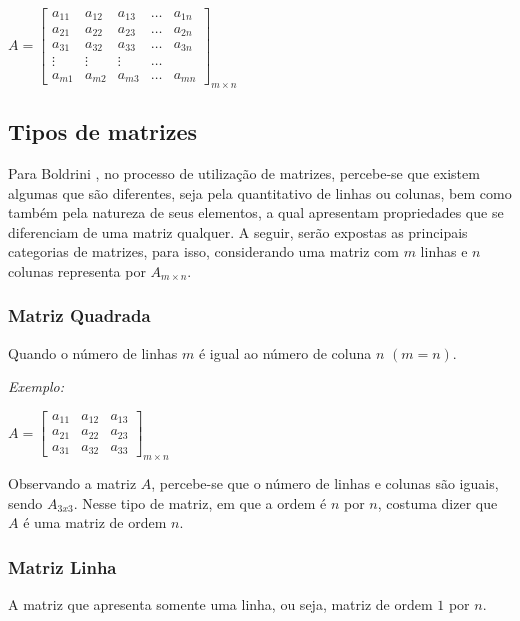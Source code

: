 \begin{center}
    $A = 
    \begin{bmatrix}
        a_{11} & a_{12} & a_{13} & \ldots & a_{1n}\\ 
        a_{21} & a_{22} & a_{23} & \ldots & a_{2n}\\ 
        a_{31} & a_{32} & a_{33} & \ldots & a_{3n}\\ 
        \vdots & \vdots & \vdots & \ldots & \\ 
        a_{m1} & a_{m2} & a_{m3} & \ldots & a_{mn}
    \end{bmatrix}_{m \times n}$
\end{center}

%
\subsection{Tipos de matrizes}
\noindent Para Boldrini \cite{1980:Boldrini}, no processo de utilização de matrizes, percebe-se que existem algumas que são diferentes, seja pela quantitativo de linhas ou colunas, bem como também pela natureza de seus elementos, a qual apresentam propriedades que se diferenciam de uma matriz qualquer. A seguir, serão expostas as principais categorias de matrizes, para isso, considerando uma matriz com $m$ linhas e $n$ colunas representa por $A{}_{m \times n}$.

\subsubsection{Matriz Quadrada}
\noindent Quando o número de linhas $m$ é igual ao número de coluna $n$ $(m = n)$.

\textit{Exemplo:}
\begin{center}
    $A = 
    \begin{bmatrix}
        a_{11} & a_{12} & a_{13} \\ 
        a_{21} & a_{22} & a_{23} \\ 
        a_{31} & a_{32} & a_{33} 
    \end{bmatrix}_{m \times n}$
\end{center}

Observando a matriz $A$, percebe-se que o número de linhas e colunas são iguais, sendo $A{}_{3x3}$. Nesse tipo de matriz, em que a ordem é $n$ por $n$, costuma dizer que $A$ é uma matriz de ordem $n$.

\subsubsection{Matriz Linha}
\noindent A matriz que apresenta somente uma linha, ou seja, matriz de ordem $1$ por $n$.

